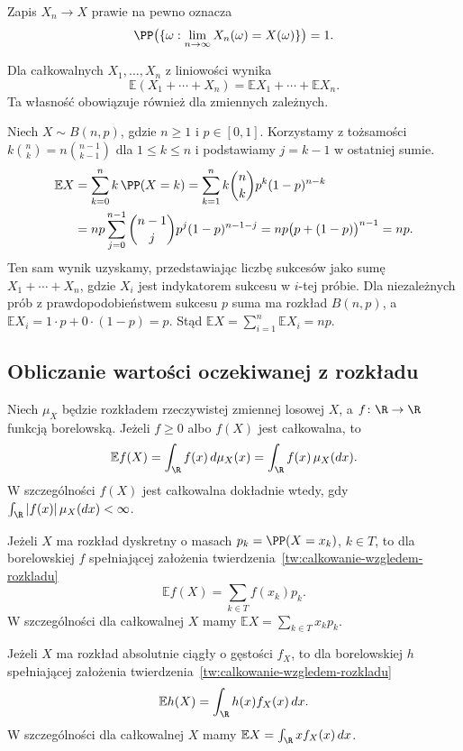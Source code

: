 Zapis $X_n\to X$ prawie na pewno oznacza
\[
  \PP\bigl(\{\omega:\lim_{n\to\infty}X_n(\omega)=X(\omega)\}\bigr)=1.
\]

\begin{uwaga}
Dla całkowalnych $X_1,\ldots,X_n$ z liniowości wynika
\[
  \mathbb{E}(X_1+\cdots+X_n)=\mathbb{E}X_1+\cdots+\mathbb{E}X_n.
\]
Ta własność obowiązuje również dla zmiennych zależnych.
\end{uwaga}

\begin{przyklad}
\label{przykl:wartosc-oczekiwana-dwumianowa}
Niech $X\sim B(n,p)$, gdzie $n\geq1$ i $p\in[0,1]$.
Korzystamy z tożsamości $k\binom{n}{k}=n\binom{n-1}{k-1}$
dla $1\leq k\leq n$ i podstawiamy $j=k-1$ w ostatniej sumie.
\begin{align*}
  \mathbb{E}X
    &=\sum_{k=0}^n k\,\PP(X=k)
      =\sum_{k=1}^n k\binom{n}{k}p^k(1-p)^{n-k}\\
    &=np\sum_{j=0}^{n-1}\binom{n-1}{j}p^j(1-p)^{n-1-j}
      =np\bigl(p+(1-p)\bigr)^{n-1}=np.
\end{align*}
Ten sam wynik uzyskamy, przedstawiając liczbę sukcesów jako sumę
$X_1+\cdots+X_n$, gdzie $X_i$ jest indykatorem sukcesu w $i$-tej próbie.
Dla niezależnych prób z prawdopodobieństwem sukcesu $p$ suma ma rozkład
$B(n,p)$, a $\mathbb{E}X_i=1\cdot p+0\cdot(1-p)=p$.
Stąd $\mathbb{E}X=\sum_{i=1}^n\mathbb{E}X_i=np$.
\end{przyklad}

\subsection{Obliczanie wartości oczekiwanej z rozkładu}

\begin{twierdzenie}
\label{tw:calkowanie-wzgledem-rozkladu}
Niech $\mu_X$ będzie rozkładem rzeczywistej zmiennej losowej $X$,
a $f\colon\R\to\R$ funkcją borelowską. Jeżeli $f\geq 0$ albo $f(X)$
jest całkowalna, to
\[
  \mathbb{E}f(X)=\int_{\R}f(x)\,d\mu_X(x)
               =\int_{\R}f(x)\,\mu_X(dx).
\]
W szczególności $f(X)$ jest całkowalna dokładnie wtedy, gdy
$\int_{\R}|f(x)|\,\mu_X(dx)<\infty$.
\end{twierdzenie}

\begin{wniosek}
Jeżeli $X$ ma rozkład dyskretny o masach $p_k=\PP(X=x_k)$, $k\in T$,
to dla borelowskiej $f$ spełniającej założenia
twierdzenia~\ref{tw:calkowanie-wzgledem-rozkladu}
\[
  \mathbb{E}f(X)=\sum_{k\in T} f(x_k)p_k.
\]
W szczególności dla całkowalnej $X$ mamy
$\mathbb{E}X=\sum_{k\in T} x_kp_k$.
\end{wniosek}

\begin{wniosek}
Jeżeli $X$ ma rozkład absolutnie ciągły o gęstości $f_X$, to dla
borelowskiej $h$ spełniającej założenia
twierdzenia~\ref{tw:calkowanie-wzgledem-rozkladu}
\[
  \mathbb{E}h(X)=\int_{\R}h(x)f_X(x)\,dx.
\]
W szczególności dla całkowalnej $X$ mamy
$\mathbb{E}X=\int_{\R}x f_X(x)\,dx$.
\end{wniosek}
